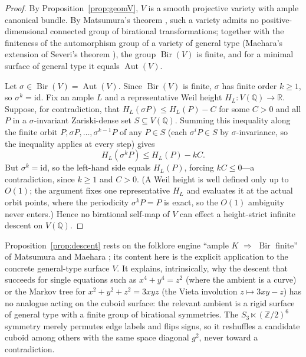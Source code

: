 \documentclass[11pt,reqno]{amsart}
\theoremstyle{plain}
\theoremstyle{definition}
\newcommand{\Q}{\mathbb{Q}}
\newcommand{\Z}{\mathbb{Z}}
\newcommand{\R}{\mathbb{R}}
\newcommand{\Aut}{\operatorname{Aut}}
\newcommand{\Bir}{\operatorname{Bir}}
\begin{document}
\begin{proof}
By Proposition~\ref{prop:geomV}, $V$ is a smooth projective variety with ample
canonical bundle. By Matsumura's theorem \cite{Matsumura}, such a variety admits
no positive-dimensional connected group of birational transformations; together
with the finiteness of the automorphism group of a variety of general type
(Maehara's extension of Severi's theorem \cite{Maehara,Iitaka}), the group
$\Bir(V)$ is finite, and for a minimal surface of general type it equals
$\Aut(V)$.

Let $\sigma\in\Bir(V)=\Aut(V)$. Since $\Bir(V)$ is finite, $\sigma$ has finite
order $k\ge1$, so $\sigma^{k}=\mathrm{id}$. Fix an ample $L$ and a representative
Weil height $H_L\colon V(\Q)\to\R$. Suppose, for contradiction, that
$H_L(\sigma P)\le H_L(P)-C$ for some $C>0$ and all $P$ in a $\sigma$-invariant
Zariski-dense set $S\subseteq V(\Q)$. Summing this inequality along the finite
orbit $P,\sigma P,\dots,\sigma^{k-1}P$ of any $P\in S$ (each $\sigma^{i}P\in S$ by
$\sigma$-invariance, so the inequality applies at every step) gives
\[
H_L(\sigma^{k}P)\le H_L(P)-kC .
\]
But $\sigma^{k}=\mathrm{id}$, so the left-hand side equals $H_L(P)$, forcing
$kC\le0$---a contradiction, since $k\ge1$ and $C>0$. (A Weil height is well
defined only up to $O(1)$; the argument fixes one representative $H_L$ and
evaluates it at the actual orbit points, where the periodicity $\sigma^{k}P=P$ is
exact, so the $O(1)$ ambiguity never enters.) Hence no birational self-map of $V$
can effect a height-strict infinite descent on $V(\Q)$.
\end{proof}

Proposition~\ref{prop:descent} rests on the folklore engine
``ample $K$ $\Rightarrow$ $\Bir$ finite'' of Matsumura and Maehara
\cite{Matsumura,Maehara,Iitaka}; its content here is the explicit application to
the concrete general-type surface $V$. It explains, intrinsically, why the descent
that succeeds for single equations such as $x^4+y^4=z^2$ (where the ambient is a
curve) or the Markov tree for $x^2+y^2+z^2=3xyz$ (the Vieta involution
$z\mapsto3xy-z$) has no analogue acting on the cuboid surface: the relevant ambient
is a rigid surface of general type with a finite group of birational symmetries.
The $S_3\ltimes(\Z/2)^6$ symmetry merely permutes edge labels and flips signs, so
it reshuffles a candidate cuboid among others with the same space diagonal $g^2$,
never toward a contradiction.
\end{document}
